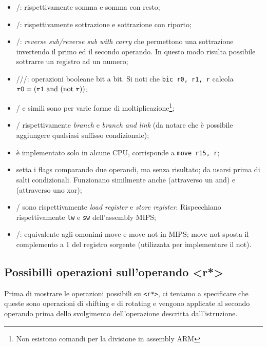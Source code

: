 \documentclass[class=book, crop=false, oneside]{standalone}
\begin{document}
\begin{itemize}
	\item {}/: rispettivamente somma e somma con resto;
	\item {}/: rispettivamente sottrazione e sottrazione con riporto;
	\item {}/: \emph{reverse sub/reverse sub with carry} che permettono una sottrazione invertendo il primo ed il secondo operando. In questo modo risulta possibile sottrarre un registro ad un numero;
	\item {}///: operazioni booleane bit a bit. Si noti che \texttt{bic r0, r1, r} calcola \(\texttt{r0} = (\texttt{r1} \textrm{ and } (\textrm{not } \texttt{r}))\);
	\item {}/ e simili sono per varie forme di moltiplicazione\footnote{Non esistono comandi per la divisione in assembly ARM};
	\item {}/ rispettivamente \emph{branch} e \emph{branch and link} (da notare che è possibile aggiungere qualsiasi suffisso condizionale);
	\item {} è implementato solo in alcune CPU, corrisponde a \texttt{move r15, r};
	\item {} setta i flags comparando due operandi, ma senza risultato; da usarsi prima di salti condizionali. Funzionano similmente anche  (attraverso un and) e  (attraverso uno xor);
	\item {}/ sono rispettivamente \emph{load register} e \emph{store register}. Rispecchiano rispettivamente \texttt{lw} e \texttt{sw} dell'assembly MIPS;
	\item {}/:  equivalente agli omonimi move e move not in MIPS; move not sposta il complemento a 1 del registro sorgente (utilizzata per implementare il not).
\end{itemize}

\subsection{Possibilli operazioni sull'operando <r*>}\label{sec:modifiche}
Prima di mostrare le operazioni possibili su \texttt{<r*>}, ci teniamo a specificare che queste sono operazioni di shifting e di rotating e vengono applicate al secondo operando prima dello svolgimento dell'operazione descritta dall'istruzione.
\end{document}
